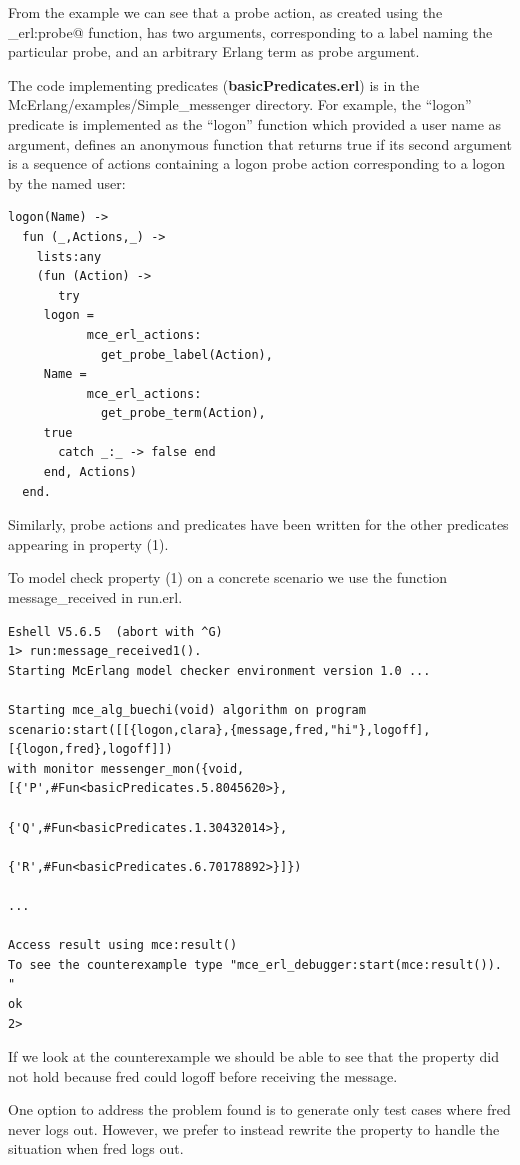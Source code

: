 \documentclass[a4paper]{article}
\newcommand{\simplemessengerdir}{McErlang/examples/Simple\_messenger\xspace}
\begin{document}
From the example we can see that a probe action,
as created using the \lstinline@mce_erl:probe@ function, has two arguments, 
corresponding to a label naming the particular probe, 
and an arbitrary Erlang term as probe argument.

The code implementing predicates ({\bf basicPredicates.erl}) is in the
\simplemessengerdir directory. For example, the ``logon'' predicate is
implemented as the ``logon'' function which provided a user name as
argument, defines an anonymous function that returns true if its
second argument is a sequence of actions containing a logon probe
action corresponding to a logon by the named user:
\begin{lstlisting}
logon(Name) ->
  fun (_,Actions,_) ->
    lists:any
    (fun (Action) ->
       try
	 logon = 
           mce_erl_actions:
             get_probe_label(Action),
	 Name = 
           mce_erl_actions:
             get_probe_term(Action),
	 true
       catch _:_ -> false end
     end, Actions)
  end.
\end{lstlisting}

Similarly, probe actions and predicates have been written for the other
predicates appearing in property (1).

To model check property (1) on a concrete scenario we use the
function message\_received in run.erl. 



\begin{verbatim}
Eshell V5.6.5  (abort with ^G)
1> run:message_received1().
Starting McErlang model checker environment version 1.0 ...

Starting mce_alg_buechi(void) algorithm on program
scenario:start([[{logon,clara},{message,fred,"hi"},logoff],[{logon,fred},logoff]])
with monitor messenger_mon({void,[{'P',#Fun<basicPredicates.5.8045620>},
                                  {'Q',#Fun<basicPredicates.1.30432014>},
                                  {'R',#Fun<basicPredicates.6.70178892>}]})

...

Access result using mce:result()
To see the counterexample type "mce_erl_debugger:start(mce:result()). "
ok
2> 
\end{verbatim}

If we look at the counterexample we should be able to see that the
property did not hold because fred could logoff before receiving the
message.

One option to address the problem found is to generate only
test cases where fred never logs out. However, we prefer to
instead rewrite the property to
handle the situation when fred logs out. 
\end{document}
